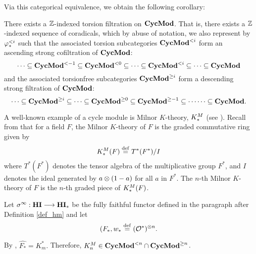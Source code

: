 Via this categorical equivalence, we obtain the following
corollary: 
\begin{cor}\label{cor_tor_filt_on_CycMod}
There exists a $\mathbb{Z}$-indexed torsion filtration on $\mathbf{CycMod}$. That
is, there exists a $\mathbb{Z}$-indexed sequence of coradicals, which by abuse
of notation, we also represent by $\varphi^{< i}_{*}$ such that the 
associated torsion subcategories $\mathbf{CycMod}^{< i}$ form an ascending 
strong cofiltration of $\mathbf{CycMod}$:
\[
\cdots \subseteq \mathbf{CycMod}^{< -1} \subseteq \mathbf{CycMod}^{< 0} \subseteq \cdots 
   \subseteq \mathbf{CycMod}^{< i} \subseteq \cdots 
   \subseteq \mathbf{CycMod}
\]
and the associated torsionfree subcategories $\mathbf{CycMod}^{\geq i}$
form a descending strong filtration of $\mathbf{CycMod}$:
\[
\cdots \subseteq \mathbf{CycMod}^{\geq i} \subseteq 
   \cdots \subseteq \mathbf{CycMod}^{\geq 0} \subseteq \mathbf{CycMod}^{\geq -1} \subseteq \cdots
   \cdots \subseteq \mathbf{CycMod}.
\]
\end{cor}

\begin{ex}\label{ex_milK}
A well-known example of a cycle module is Milnor $K$-theory,
$K^M_*$ (see \cite[1.4, 2.5]{Rost96}). Recall from \cite{MilK} that 
for a field $F$, the Milnor $K$-theory of $F$ is the graded 
commutative ring given by
\[
K^M_*(F) \stackrel{\mathrm{def}}{=} T^*(F^*)/I
\]
where $T^*(F^*)$ denotes the tensor algebra of the multiplicative 
group $F^*$, and $I$ denotes the ideal generated by $a \otimes 
(1 - a)$ for all $a$ in $F^*$. The $n$-th Milnor $K$-theory of $F$ 
is the $n$-th graded piece of $K^M_*(F)$.

Let $\sigma^\infty:\mathbf{HI} \longrightarrow \mathbf{HI}_*$ be the fully faithful functor defined in
the paragraph after Definition \ref{def_hm} and let \[ (F_*,w_*
\stackrel{\mathrm{def}}{=} (\mathcal{O}^*)^{\otimes n}. \]

By \cite[3.7]{DegModHom}, $\widehat{F_*} = K_m^*.$ Therefore, $K^M_n
\in \mathbf{CycMod}^{< n} \cap \mathbf{CycMod}^{\geq n}$.
\end{ex}

%
